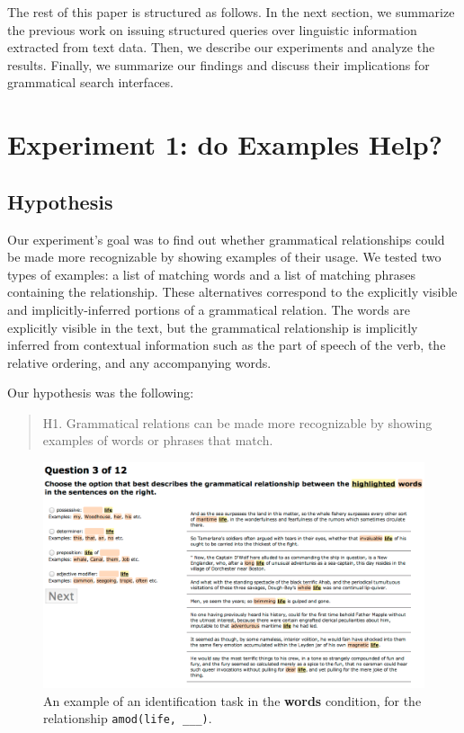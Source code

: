 \documentclass{sigchi}
\newcommand{\strong}[1] {\textbf{#1}}
\newcommand{\code}[1] {\texttt{#1}}
\begin{document}
The rest of this paper is structured as follows. In the next section, we summarize the previous work on issuing structured queries over linguistic information extracted from text data. Then, we  describe our experiments and analyze the results. Finally, we summarize our findings and discuss their implications for grammatical search interfaces.

\section{Experiment 1: do Examples Help?}

\subsection{Hypothesis}
Our experiment's goal was to find out whether grammatical relationships could be made more recognizable by showing examples of their usage. We tested two types of examples: a list of matching words and a list of matching phrases containing the relationship. These alternatives correspond to the explicitly visible and implicitly-inferred portions of a grammatical relation. The words are explicitly visible in the text, but the grammatical relationship is implicitly inferred from contextual information such as the part of speech of the verb, the relative ordering, and any accompanying words.

Our hypothesis was the following:
\begin{quote}
	H1. Grammatical relations can be made more recognizable by showing examples of words or phrases that match.
\end{quote}


\begin{figure}
\includegraphics[width=\columnwidth]{fig/task}
\caption{\label{fig:task} An example of an identification task in the \strong{words} condition, for the relationship \code{amod(life, \_\_\_)}.}
\end{figure}
\end{document}
